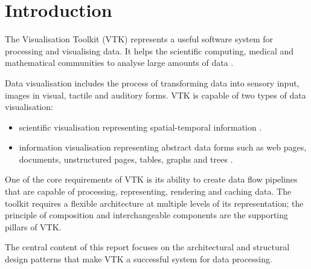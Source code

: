 \section{Introduction}

The Visualisation Toolkit (VTK) represents a useful software system for processing and visualising data. It helps the scientific computing, medical and mathematical communities to analyse large amounts of data \cite{aosabook}.

Data visualisation includes the process of transforming data into sensory input, images in visual, tactile and auditory forms. VTK is capable of two types of data visualisation:

\begin{itemize}
    \item scientific visualisation representing spatial-temporal information \cite{aosabook}.
    \item information visualisation representing abstract data forms such as web pages, documents, unstructured pages, tables, graphs and trees \cite{aosabook}.
\end{itemize}

One of the core requirements of VTK is its ability to create data flow pipelines that are capable of processing, representing, rendering and caching data. The toolkit requires a flexible architecture at multiple levels of its representation; the principle of composition and interchangeable components are the supporting pillars of VTK.

The central content of this report focuses on the architectural and structural design patterns that make VTK a successful system for data processing.